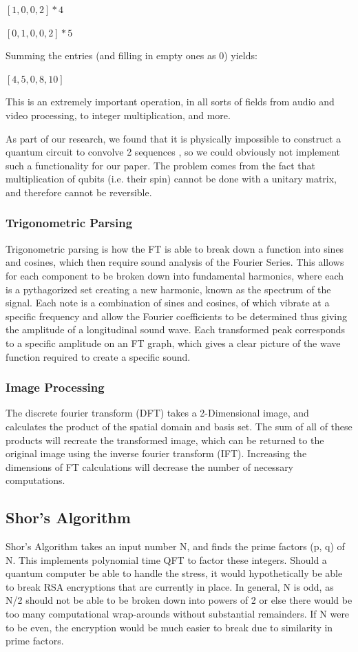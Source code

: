 \documentclass[a4paper,11pt]{article}
\theoremstyle{mytheor}
\begin{document}
$[1, 0, 0, 2] * 4$

$[0, 1, 0, 0, 2] * 5$

Summing the entries (and filling in empty ones as $0$) yields:

$[4, 5, 0, 8, 10]$

This is an extremely important operation, in all sorts of fields from audio and video processing, to integer multiplication, and more.

As part of our research, we found that it is physically impossible to construct a quantum circuit to convolve 2 sequences \cite{qconv}, so we could obviously not implement such a functionality for our paper. The problem comes from the fact that multiplication of qubits (i.e. their spin) cannot be done with a unitary matrix, and therefore cannot be reversible.


\subsubsection{Trigonometric Parsing}
\cite{SF}
Trigonometric parsing is how the FT is able to break down a function into sines and cosines, which then require sound analysis of the Fourier Series.  This allows for each component to be broken down into fundamental harmonics, where each is a pythagorized set creating a new harmonic, known as the spectrum of the signal.  Each note is a combination of sines and cosines, of which vibrate at a specific frequency and allow the Fourier coefficients to be determined thus giving the amplitude of a longitudinal sound wave.  Each transformed peak corresponds to a specific amplitude on an FT graph, which gives a clear picture of the wave function required to create a specific sound.

\subsubsection{Image Processing}
\cite{Vision}\cite{PErr}\cite{Robo}\cite{Img}\cite{DIP}
The discrete fourier transform (DFT) takes a 2-Dimensional image, and calculates the product of the spatial domain and basis set.  The sum of all of these products will recreate the transformed image, which can be returned to the original image using the inverse fourier transform (IFT).  Increasing the dimensions of FT calculations will decrease the number of necessary computations.

\subsection{Shor's Algorithm}
\cite{C5}\cite{Prime}\cite{QCQI}\cite{DFa}
Shor’s Algorithm takes an input number N, and finds the prime factors (p, q) of N.  This implements polynomial time QFT to factor these integers.  Should a quantum computer be able to handle the stress, it would hypothetically be able to break RSA encryptions that are currently in place.  In general, N is odd, as N/2 should not be able to be broken down into powers of 2 or else there would be too many computational wrap-arounds without substantial remainders.  If N were to be even, the encryption would be much easier to break due to similarity in prime factors.  
\end{document}
